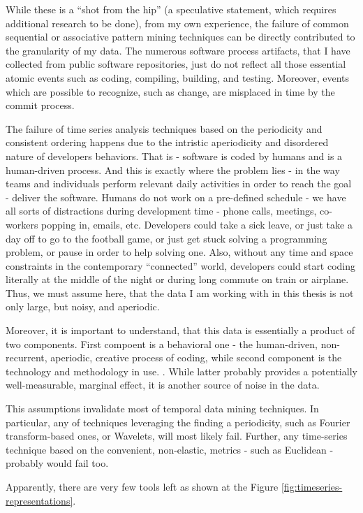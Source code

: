 \documentclass[11pt,oneside]{article}
\numberwithin{equation}{subsection}
\begin{document}
While these is a ``shot from the hip'' (a speculative statement, which requires additional
research to be done), from my own experience, the failure of common sequential or associative 
pattern mining techniques can be directly contributed to the granularity of my data. The numerous
software process artifacts, that I have collected from public software repositories, just do not
reflect all those essential atomic events such as coding, compiling, building, and testing.
Moreover, events which are possible to recognize, such as change, are misplaced in time by the
commit process. 

The failure of time series analysis techniques based on the periodicity and consistent ordering
happens due to the intristic aperiodicity and disordered nature of developers behaviors.
That is - software is coded by humans and is a human-driven process. 
And this is exactly where the problem lies - in the way teams and individuals
perform relevant daily activities in order to reach the goal - deliver the software.
Humans do not work on a pre-defined schedule - we have all sorts of distractions 
during development time - phone calls, meetings, co-workers popping in, emails, etc.
Developers could take a sick leave, or just take a day off to go to the football game,
or just get stuck solving a programming problem, or pause in order to help solving one.
Also, without any time and space constraints in the contemporary ``connected'' world,
developers could start coding literally at the middle of the night or during long 
commute on train or airplane. Thus, we must assume here, that the
data I am working with in this thesis is not only large, but noisy, and aperiodic.

Moreover, it is important to understand, that this data is essentially a product of two
components. First compoent is a behavioral one - the human-driven, non-recurrent, aperiodic,
creative process of coding, while second component is the technology and methodology in use.
.
While latter probably provides a potentially well-measurable, marginal effect, it is another 
source of noise in the data.

This assumptions invalidate most of temporal data mining techniques. In particular,
any of techniques leveraging the finding a periodicity, such as Fourier transform-based 
ones, or Wavelets, will most likely fail. Further, any time-series technique based 
on the convenient, non-elastic, metrics - such as Euclidean - probably would fail too.

Apparently, there are very few tools left as shown at the
Figure \ref{fig:timeseries-representations}. 
\end{document}
